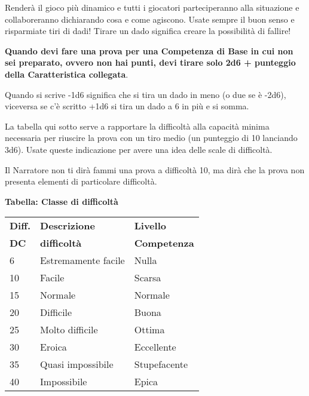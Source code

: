 \begin{multicols}{2}
\begin{narratore}
Renderà il gioco più dinamico e tutti i giocatori parteciperanno alla situazione e collaboreranno dichiarando cosa e come agiscono. Usate sempre il buon senso e risparmiate tiri di dadi! Tirare un dado significa creare la possibilità di fallire!
\end{narratore}

%

\medskip

\textbf{Quando devi fare una prova per una Competenza di Base in cui non sei preparato, ovvero non hai punti, devi tirare solo 2d6 + punteggio della Caratteristica collegata}.

Quando si scrive -1d6 significa che si tira un dado in meno (o due se è -2d6), viceversa se c'è scritto +1d6 si tira un dado a 6 in più e si somma.

La tabella qui sotto serve a rapportare la difficoltà alla capacità minima necessaria per riuscire la prova con un tiro medio (un punteggio di 10 lanciando 3d6). Usate queste indicazione per avere una idea delle scale di difficoltà.

Il Narratore non ti dirà fammi una prova a difficoltà 10, ma dirà che la prova non presenta elementi di particolare difficoltà.

%

\medskip

\textbf{Tabella: Classe di difficoltà}\label{basedifficolta}

\medskip

\noindent\begin{tabularx}{\linewidth}{lll}
	\toprule
\textbf{Diff.} & \textbf{Descrizione} & \textbf{Livello}\\
\textbf{DC}&\textbf{difficoltà}& \textbf{Competenza}\\
\toprule
6 & Estremamente facile & Nulla\\
10 & Facile & Scarsa\\
15 & Normale & Normale\\
20 & Difficile & Buona\\
25 & Molto difficile & Ottima\\
30 & Eroica& Eccellente\\
35 & Quasi impossibile & Stupefacente\\
40 & Impossibile & Epica
\end{tabularx}


\end{multicols}

